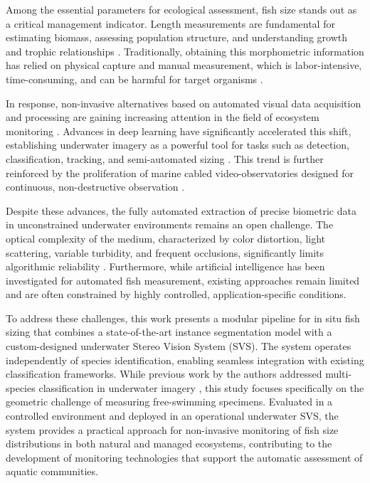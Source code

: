 \documentclass[utf8]{FrontiersinHarvard} %
\begin{document}
Among the essential parameters for ecological assessment, fish size stands out as a critical management indicator. Length measurements are fundamental for estimating biomass, assessing population structure, and understanding growth and trophic relationships \citep{Siddiqui2025, Marrable2023}. Traditionally, obtaining this morphometric information has relied on physical capture and manual measurement, which is labor-intensive, time-consuming, and can be harmful for target organisms \citep{Abinaya2022,CAI2020102117}.



In response, non-invasive alternatives based on automated visual data acquisition and processing are gaining increasing attention in the field of ecosystem monitoring \citep{Elmezain2025}. Advances in deep learning have significantly accelerated this shift, establishing underwater imagery as a powerful tool for tasks such as detection, classification, tracking, and semi-automated sizing \citep{Saleh2022, unlocking_goodwin_2022, Siddiqui2018, Garcia2020}. This trend is further reinforced by the proliferation of marine cabled video-observatories designed for continuous, non-destructive observation \citep{Marini2018, lopez2020video}.

Despite these advances, the fully automated extraction of precise biometric data in unconstrained underwater environments remains an open challenge. The optical complexity of the medium, characterized by color distortion, light scattering, variable turbidity, and frequent occlusions, significantly limits algorithmic reliability \citep{Elmezain2025}. Furthermore, while artificial intelligence has been investigated for automated fish measurement, existing approaches remain limited and are often constrained by highly controlled, application-specific conditions. 


To address these challenges, this work presents a modular pipeline for in situ fish sizing that combines a state-of-the-art instance segmentation model with a custom-designed underwater Stereo Vision System (SVS). The system operates independently of species identification, enabling seamless integration with existing classification frameworks. While previous work by the authors addressed multi-species classification in underwater imagery \citep{muntaner2025automatic}, this study focuses specifically on the geometric challenge of measuring free-swimming specimens. Evaluated in a controlled environment and deployed in an operational underwater SVS, the system provides a practical approach for non-invasive monitoring of fish size distributions in both natural and managed ecosystems, contributing to the development of monitoring technologies that support the automatic assessment of aquatic communities.
\end{document}
